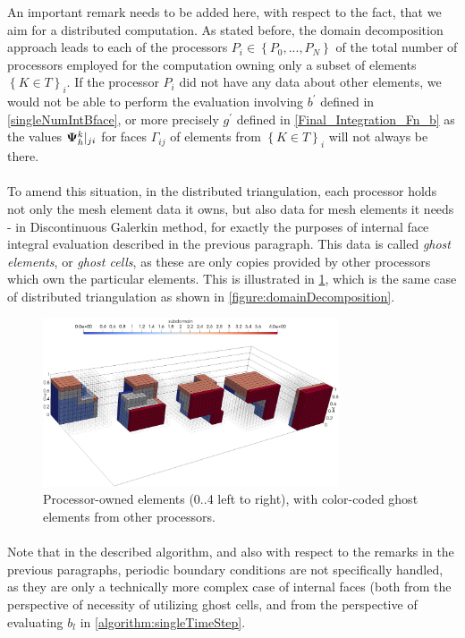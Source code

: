 An important remark needs to be added here, with respect to the fact, that we aim for a distributed computation. As stated before, the domain decomposition approach leads to each of the processors $P_i \in \left\{P_0, ..., P_N\right\}$ of the total number of processors employed for the computation owning only a subset of elements $\left\{K \in T\right\}_i$. If the processor $P_i$ did not have any data about other elements, we would not be able to perform the evaluation involving $b^{'}$ defined in \cref{singleNumIntBface}, or more precisely $g^{'}$ defined in \cref{Final_Integration_Fn_b} as the values ${\mathrm{\mathbf{\Psi}}_h^{k}}|_{ji}$ for faces $\Gamma_{ij}$ of elements from $\left\{K \in T\right\}_i$ will not always be there.
\paragraph{}
To amend this situation, in the distributed triangulation, each processor holds not only the mesh element data it owns, but also data for mesh elements it needs - in Discontinuous Galerkin method, for exactly the purposes of internal face integral evaluation described in the previous paragraph. This data is called \textit{ghost elements}, or \textit{ghost cells}, as these are only copies provided by other processors which own the particular elements. This is illustrated in \cref{figure:ghost}, which is the same case of distributed triangulation as shown in \cref{figure:domainDecomposition}.

\begin{figure}[H]
		\begin{center}
			\includegraphics[width=0.78\textwidth]{img/mesh/cube-NONperiodic,ghost.jpg}
			\vspace{-2mm}
		\caption{Processor-owned elements (0..4 left to right), with color-coded ghost elements from other processors.}
		\label{figure:ghost}
		\end{center}
	\end{figure}\vspace{-5mm}

\paragraph{}
Note that in the described algorithm, and also with respect to the remarks in the previous paragraphs, periodic boundary conditions are not specifically handled, as they are only a technically more complex case of internal faces (both from the perspective of necessity of utilizing ghost cells, and from the perspective of evaluating $b_{l}$ in \cref{algorithm:singleTimeStep}.